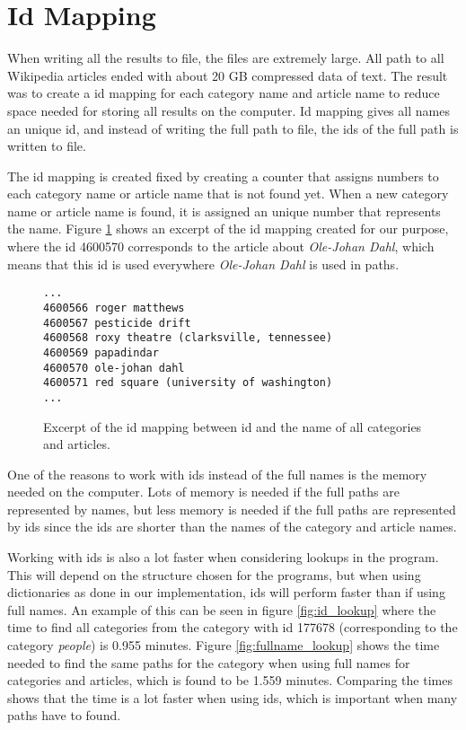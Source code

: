 \section{Id Mapping}
When writing all the results to file, the files are extremely large. All path to all Wikipedia articles ended with about 20 GB compressed data of text. The result was to create a id mapping for each category name and article name to reduce space needed for storing all results on the computer. Id mapping gives all names an unique id, and instead of writing the full path to file, the ids of the full path is written to file.

The id mapping is created fixed by creating a counter that assigns numbers to each category name or article name that is not found yet. When a new category name or article name is found, it is assigned an unique number that represents the name. Figure \ref{fig:idmapping} shows an excerpt of the id mapping created for our purpose, where the id 4600570 corresponds to the article about \emph{Ole-Johan Dahl}, which means that this id is used everywhere \emph{Ole-Johan Dahl} is used in paths. 

\begin{figure}[h]
\centering
\begin{lstlisting}
...
4600566 roger matthews
4600567 pesticide drift
4600568 roxy theatre (clarksville, tennessee)
4600569 papadindar
4600570 ole-johan dahl
4600571 red square (university of washington)
...
\end{lstlisting}
\caption[Id mapping example]{Excerpt of the id mapping between id and the name of all categories and articles.}
\label{fig:idmapping}
\end{figure}

One of the reasons to work with ids instead of the full names is the memory needed on the computer. Lots of memory is needed if the full paths are represented by names, but less memory is needed if the full paths are represented by ids since the ids are shorter than the names of the category and article names. 

Working with ids is also a lot faster when considering lookups in the program. This will depend on the structure chosen for the programs, but when using dictionaries as done in our implementation, ids will perform faster than if using full names. An example of this can be seen in figure \ref{fig:id_lookup} where the time to find all categories from the category with id 177678 (corresponding to the category \emph{people}) is 0.955 minutes. Figure \ref{fig:fullname_lookup} shows the time needed to find the same paths for the category when using full names for categories and articles, which is found to be 1.559 minutes. Comparing the times shows that the time is a lot faster when using ids, which is important when many paths have to found.

